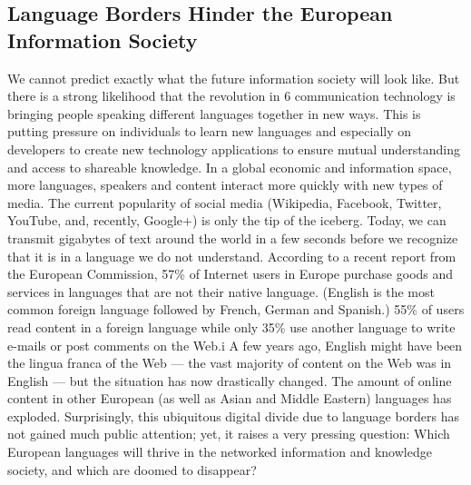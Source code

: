 \documentclass[]{../metanetpaper}
\begin{document}
	\subsection{Language Borders Hinder the European Information Society}
We cannot predict exactly what the future information society will look like. But there is a strong likelihood that the revolution in 6 communication technology is bringing people speaking different languages together in new ways. This is putting pressure on individuals to learn new languages and especially on developers to create new technology applications to ensure mutual understanding and access to shareable knowledge.
In a global economic and information space, more languages, speakers and content interact more quickly with new types of media. The current popularity of social media (Wikipedia, Facebook, Twitter, YouTube, and, recently, Google+) is only the tip of the iceberg. Today, we can transmit gigabytes of text around the world in a few seconds before we recognize that it is in a language we do not understand. According to a recent report from the European Commission, 57\% of Internet users in Europe purchase goods and services in languages that are not their native language. (English is the most common foreign language followed by French, German and Spanish.) 55\% of users read content in a foreign language while only 35\% use another language to write e-mails or post comments on the Web.i A few years ago, English might have been the lingua franca of the Web — the vast majority of content on the Web was in English — but the situation has now drastically changed. The amount of online content in other European (as well as Asian and Middle
Eastern) languages has exploded. Surprisingly, this ubiquitous digital divide due to language borders has not gained much public attention; yet, it raises a very pressing question: Which European languages will thrive in the networked
information and knowledge society, and which are doomed to disappear?
\end{document}
